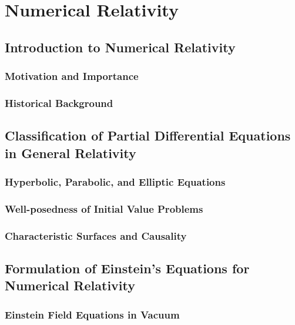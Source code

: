 \part{Numerical Relativity}\label{part:numerical-relativity}
\chapter{Introduction to Numerical Relativity}\label{ch:introduction-to-numerical-relativity}
\section{Motivation and Importance}\label{sec:motivation-and-importance}
\section{Historical Background}\label{sec:historical-background}

\chapter{Classification of Partial Differential Equations in General Relativity}\label{ch:classification-of-partial-differential-equations-in-general-relativity}
\section{Hyperbolic, Parabolic, and Elliptic Equations}\label{sec:hyperbolic-parabolic-and-elliptic-equations}
\section{Well-posedness of Initial Value Problems}\label{sec:well-posedness-of-initial-value-problems}
\section{Characteristic Surfaces and Causality}\label{sec:characteristic-surfaces-and-causality}

\chapter{Formulation of Einstein's Equations for Numerical Relativity}\label{ch:formulation-of-einsteins-equations-for-numerical-relativity}
\section{Einstein Field Equations in Vacuum}\label{sec:einstein-field-equations-in-vacuum}
